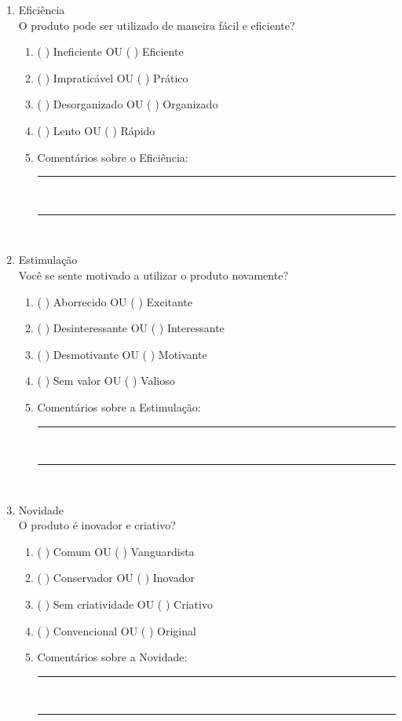 \begin{apendicesenv}
\begin{enumerate}
\begin{enumerate}
    \end{enumerate}


    \item Eficiência\\O produto pode ser utilizado de maneira fácil e eficiente?
    \begin{enumerate}
        \item ( ) Ineficiente OU ( ) Eficiente
        \item ( ) Impraticável OU ( ) Prático
        \item ( ) Desorganizado OU ( ) Organizado
        \item( ) Lento OU ( ) Rápido
        \item Comentários sobre o Eficiência:\hrulefill \\     
        \rule{14cm}{.1pt}\\
        \rule{14cm}{.1pt}\\
        
    \end{enumerate}


    \item Estimulação\\Você se sente motivado a utilizar o produto novamente?
    \begin{enumerate}
        \item ( ) Aborrecido OU ( ) Excitante
        \item ( ) Desinteressante OU ( ) Interessante
        \item ( ) Desmotivante OU ( ) Motivante
        \item ( ) Sem valor OU ( ) Valioso
        \item Comentários sobre a Estimulação:\hrulefill \\      
        \rule{14cm}{.1pt}\\
        \rule{14cm}{.1pt}\\
        
    \end{enumerate}
    
    \item Novidade\\O produto é inovador e criativo?
    \begin{enumerate}
        \item ( ) Comum OU ( ) Vanguardista
        \item ( ) Conservador OU ( ) Inovador
        \item ( ) Sem criatividade OU ( ) Criativo
        \item ( ) Convencional OU ( ) Original
        \item Comentários sobre a Novidade:\hrulefill \\     
        \rule{14cm}{.1pt}\\
        \rule{14cm}{.1pt}\\
    \end{enumerate}


\end{enumerate}
\end{apendicesenv}
